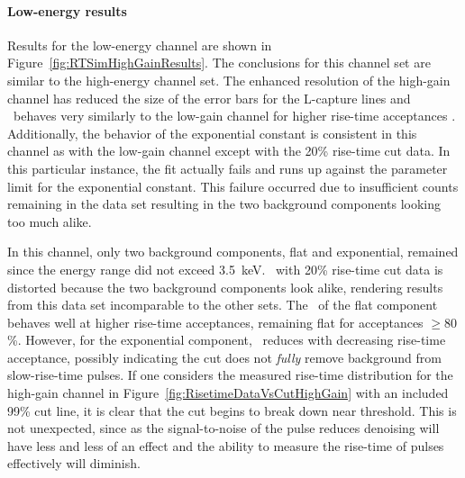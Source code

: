 					\paragraph{Low-energy results}

Results for the low-energy channel are shown in Figure~\ref{fig:RTSimHighGainResults}. The conclusions for this channel set are similar to the high-energy channel set.  The enhanced resolution of the high-gain channel has reduced the size of the error bars for the L-capture lines and \releff~behaves very similarly to the low-gain channel for higher rise-time acceptances .  Additionally, the behavior of the exponential constant is consistent in this channel as with the low-gain channel except with the 20\% rise-time cut data.  In this particular instance, the fit actually fails and runs up against the parameter limit for the exponential constant.  This failure occurred due to insufficient counts remaining in the data set resulting in the two background components looking too much alike.

In this channel, only two background components, flat and exponential, remained since the energy range did not exceed 3.5~keV.  \releff~with 20\% rise-time cut data is distorted because the two background components look alike, rendering results from this data set incomparable to the other sets.  The \releff~of the flat component behaves well at higher rise-time acceptances, remaining flat for acceptances $\ge80$\%.  However, for the exponential component, \releff~reduces with decreasing rise-time acceptance, possibly indicating the cut does not \emph{fully} remove background from slow-rise-time pulses.  If one considers the measured rise-time distribution for the high-gain channel in Figure~\ref{fig:RisetimeDataVsCutHighGain} with an included 99\% cut line, it is clear that the cut begins to break down near threshold.  
This is not unexpected, since as the signal-to-noise of the pulse reduces denoising will have less and less of an effect and the ability to measure the rise-time of pulses effectively will diminish.

						\begin{sidewaysfigure}
							\centering
							\caption[Behavior of fit components after cuts for high-gain BeGe channel]
							{Behavior of fit components after cuts for high-gain channel.}
							\label{fig:RTSimHighGainResults}
						\end{sidewaysfigure}
						

